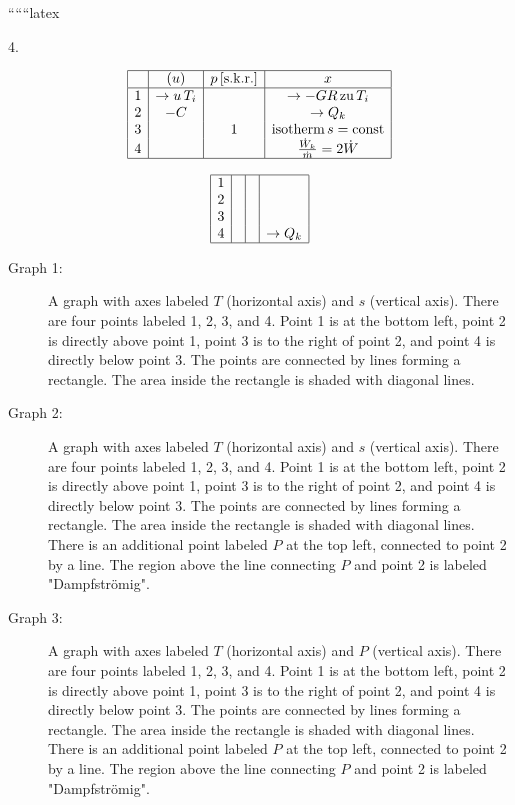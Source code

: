 
``````latex


4.

\[
\begin{array}{|c|c|c|c|}
\hline
 & (u) & p \, [\text{s.k.r.}] & x \\
\hline
1 & \rightarrow u \, T_i & & \rightarrow -GR \, \text{zu} \, T_i \\
2 & -C & & \rightarrow Q_k \\
3 & & 1 & \text{isotherm} \, s = \text{const} \\
4 & & & \frac{\dot{W}_k}{\dot{m}} = 2 \dot{W} \\
\hline
\end{array}
\]

\[
\begin{array}{|c|c|c|c|}
\hline
1 & & & \\
2 & & & \\
3 & & & \\
4 & & & \rightarrow Q_k \\
\hline
\end{array}
\]

\begin{description}
\item[Graph 1:] 
A graph with axes labeled $T$ (horizontal axis) and $s$ (vertical axis). There are four points labeled 1, 2, 3, and 4. Point 1 is at the bottom left, point 2 is directly above point 1, point 3 is to the right of point 2, and point 4 is directly below point 3. The points are connected by lines forming a rectangle. The area inside the rectangle is shaded with diagonal lines.

\item[Graph 2:] 
A graph with axes labeled $T$ (horizontal axis) and $s$ (vertical axis). There are four points labeled 1, 2, 3, and 4. Point 1 is at the bottom left, point 2 is directly above point 1, point 3 is to the right of point 2, and point 4 is directly below point 3. The points are connected by lines forming a rectangle. The area inside the rectangle is shaded with diagonal lines. There is an additional point labeled $P$ at the top left, connected to point 2 by a line. The region above the line connecting $P$ and point 2 is labeled "Dampfströmig".

\item[Graph 3:] 
A graph with axes labeled $T$ (horizontal axis) and $P$ (vertical axis). There are four points labeled 1, 2, 3, and 4. Point 1 is at the bottom left, point 2 is directly above point 1, point 3 is to the right of point 2, and point 4 is directly below point 3. The points are connected by lines forming a rectangle. The area inside the rectangle is shaded with diagonal lines. There is an additional point labeled $P$ at the top left, connected to point 2 by a line. The region above the line connecting $P$ and point 2 is labeled "Dampfströmig".
\end{description}

